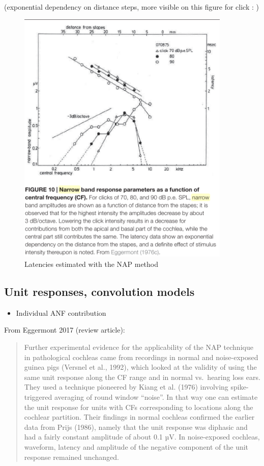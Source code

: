 \documentclass[]{article}
\providecommand{\tightlist}{%
  \setlength{\itemsep}{0pt}\setlength{\parskip}{0pt}}
\begin{document}
(exponential dependency on distance steps, more visible on this figure
for click : )

\begin{figure}
\centering
\includegraphics[width=4in,height=\textheight]{./figures/NAP_click_latencies.png}
\caption{Latencies estimated with the NAP method}
\end{figure}

\clearpage

\hypertarget{unit-responses-convolution-models}{%
\subsection{Unit responses, convolution
models}\label{unit-responses-convolution-models}}

\begin{itemize}
\tightlist
\item
  Individual ANF contribution
\end{itemize}

From Eggermont 2017 (review article):

\begin{quote}
Further experimental evidence for the applicability of the NAP technique
in pathological cochleas came from recordings in normal and
noise-exposed guinea pigs (Versnel et al., 1992), which looked at the
validity of using the same unit response along the CF range and in
normal vs.~hearing loss ears. They used a technique pioneered by Kiang
et al. (1976) involving spike-triggered averaging of round window
``noise''. In that way one can estimate the unit response for units with
CFs corresponding to locations along the cochlear partition. Their
findings in normal cochleas confirmed the earlier data from Prijs
(1986), namely that the unit response was diphasic and had a fairly
constant amplitude of about 0.1 µV. In noise-exposed cochleas, waveform,
latency and amplitude of the negative component of the unit response
remained unchanged.
\end{quote}
\end{document}
